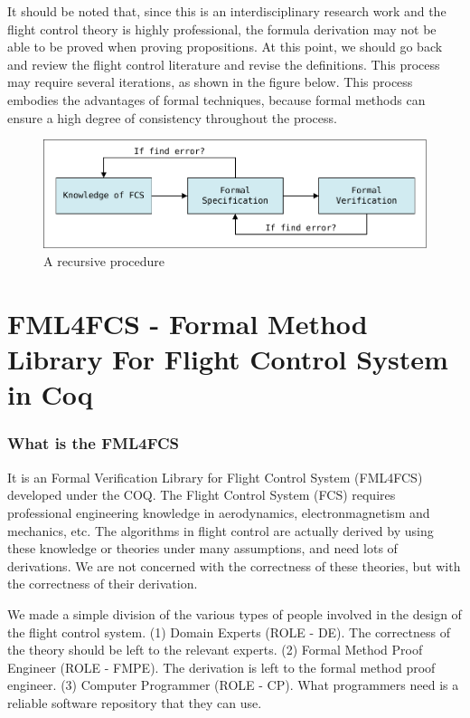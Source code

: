 \documentclass{article} %
\numberwithin{equation}{section} %
\begin{document}
It should be noted that, since this is an interdisciplinary research work and the flight control theory is highly professional, the formula derivation may not be able to be proved when proving propositions.
At this point, we should go back and review the flight control literature and revise the definitions.
This process may require several iterations, as shown in the figure below.
This process embodies the advantages of formal techniques, because formal methods can ensure a high degree of consistency throughout the process.

\begin{figure}[H]%
\centering
\includegraphics[width=1.0\textwidth]{knowledge_definition_proof.pdf}
\caption{A recursive procedure}
\end{figure}

\section{FML4FCS - Formal Method Library For Flight Control System in Coq}

\subsubsection{What is the FML4FCS}
It is an Formal Verification Library for Flight Control System (FML4FCS) developed under the COQ.
The Flight Control System (FCS) requires professional engineering knowledge in aerodynamics, electronmagnetism and mechanics, etc.
The algorithms in flight control are actually derived by using these knowledge or theories under many assumptions, and need lots of derivations.
We are not concerned with the correctness of these theories, but with the correctness of their derivation.

We made a simple division of the various types of people involved in the design of the flight control system.
(1) Domain Experts (ROLE - DE). The correctness of the theory should be left to the relevant experts.
(2) Formal Method Proof Engineer (ROLE - FMPE). The derivation is left to the formal method proof engineer.
(3) Computer Programmer (ROLE - CP). What programmers need is a reliable software repository that they can use.
\end{document}
